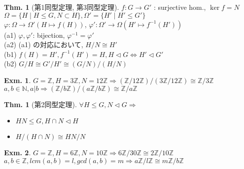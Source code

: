 \documentclass[uplatex,dvipdfmx,9pt]{beamer}
\newcommand{\nsubgroup}{\vartriangleleft} %
\newcommand{\inverse}[1]{#1^{-1}}
\newcounter{textThmCount}
\theoremstyle{definition} %
\newtheorem{thmText}[textThmCount]{Thm.}
\theoremstyle{example}
\newtheorem{exm}{Exm.}[subsection]
\begin{document}
      \begin{frame}

        \begin{thmText}[第1同型定理, 第3同型定理]
          $f\colon G \to G'$ : surjective hom., $\ker f = N$ \\
          $\Omega = \{ H \mid H \le G, N \subset H \}, \Omega' = \{ H' \mid H' \le G' \}$ \\
          $\varphi\colon \Omega \to \Omega'(H \mapsto f(H))$, $\varphi'\colon \Omega' \to \Omega (H' \mapsto \inverse{f}(H'))$ \\
          (a1) $\varphi, \varphi'$: bijection, $\inverse{\varphi} = \varphi'$ \\
          (a2) (a1) の対応において, $H/N \cong H'$ \\
          (b1) $f(H) = H', \inverse{f}(H') = H, H \nsubgroup G \Leftrightarrow H' \nsubgroup G'$ \\
          (b2) $G/H \cong G'/H' \cong (G/N)/(H/N)$
        \end{thmText} 

        \begin{exm}
          $G = \mathbb{Z}, H = 3\mathbb{Z}, N = 12\mathbb{Z} \Rightarrow (\mathbb{Z} / 12\mathbb{Z}) / (3\mathbb{Z} / 12\mathbb{Z}) \cong \mathbb{Z} / 3\mathbb{Z}$ \\
          $a, b \in \mathbb{N}, a|b \Rightarrow (\mathbb{Z} / b\mathbb{Z}) / (a\mathbb{Z} / b\mathbb{Z}) \cong \mathbb{Z} / a\mathbb{Z}$
        \end{exm}
        
      \end{frame}

      \begin{frame}

        \begin{thmText}[第2同型定理]
          $\forall H \le G, N \nsubgroup G \Rightarrow $
          \begin{itemize}
            \item $HN \le G, H \cap N \nsubgroup H$
            \item $H/(H \cap N) \cong HN/N$
          \end{itemize}
        \end{thmText}

        \begin{exm}
          $G = \mathbb{Z}, H = 6\mathbb{Z}, N = 10\mathbb{Z} \Rightarrow 6\mathbb{Z} / 30\mathbb{Z} \cong 2\mathbb{Z} / 10\mathbb{Z}$ \\
          $a, b \in \mathbb{Z}, lcm(a, b) = l, gcd(a, b) = m \Rightarrow a\mathbb{Z} / l\mathbb{Z} \cong m\mathbb{Z} / b\mathbb{Z}$
        \end{exm}

      \end{frame}
\end{document}
